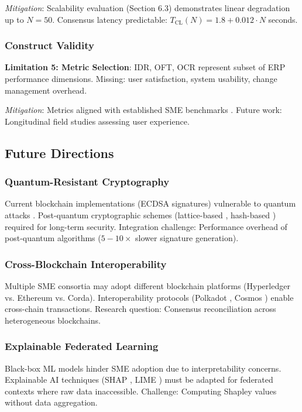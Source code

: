 \documentclass[times,10pt,twocolumn]{jucs2e}
\begin{document}
\textit{Mitigation}: Scalability evaluation (Section 6.3) demonstrates linear degradation up to $N = 50$. Consensus latency predictable: $T_{\text{CL}}(N) = 1.8 + 0.012 \cdot N$ seconds.

\subsubsection{Construct Validity}

\textbf{Limitation 5: Metric Selection}: IDR, OFT, OCR represent subset of ERP performance dimensions. Missing: user satisfaction, system usability, change management overhead.

\textit{Mitigation}: Metrics aligned with established SME benchmarks \cite{Davis2023,Garcia2024}. Future work: Longitudinal field studies assessing user experience.

\subsection{Future Directions}

\subsubsection{Quantum-Resistant Cryptography}

Current blockchain implementations (ECDSA signatures) vulnerable to quantum attacks \cite{Shor1997}. Post-quantum cryptographic schemes (lattice-based \cite{Ajtai1996}, hash-based \cite{Merkle1987}) required for long-term security. Integration challenge: Performance overhead of post-quantum algorithms ($5-10\times$ slower signature generation).

\subsubsection{Cross-Blockchain Interoperability}

Multiple SME consortia may adopt different blockchain platforms (Hyperledger vs. Ethereum vs. Corda). Interoperability protocols (Polkadot \cite{Wood2016}, Cosmos \cite{Kwon2016}) enable cross-chain transactions. Research question: Consensus reconciliation across heterogeneous blockchains.

\subsubsection{Explainable Federated Learning}

Black-box ML models hinder SME adoption due to interpretability concerns. Explainable AI techniques (SHAP \cite{Lundberg2017}, LIME \cite{Ribeiro2016}) must be adapted for federated contexts where raw data inaccessible. Challenge: Computing Shapley values without data aggregation.
\end{document}
